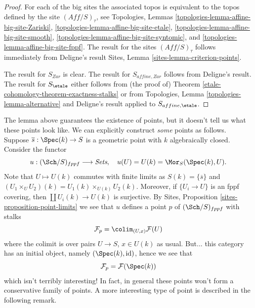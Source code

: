 \begin{proof}
For each of the big sites the associated topos is equivalent to the
topos defined by the site $(\textit{Aff}/S)_\tau$, see
Topologies, Lemmas \ref{topologies-lemma-affine-big-site-Zariski},
\ref{topologies-lemma-affine-big-site-etale},
\ref{topologies-lemma-affine-big-site-smooth},
\ref{topologies-lemma-affine-big-site-syntomic}, and
\ref{topologies-lemma-affine-big-site-fppf}.
The result for the sites $(\textit{Aff}/S)_\tau$ follows immediately
from Deligne's result
Sites, Lemma \ref{sites-lemma-criterion-points}.

\medskip\noindent
The result for $S_{Zar}$ is clear. The result for $S_{affine, Zar}$
follows from Deligne's result. The result for $S_\etale$
either follows from (the proof of)
Theorem \ref{etale-cohomology-theorem-exactness-stalks}
or from Topologies, Lemma \ref{topologies-lemma-alternative}
and Deligne's result applied to $S_{affine, \etale}$.
\end{proof}

The lemma above guarantees the existence of points, but it doesn't
tell us what these points look like. We can explicitly construct
{\it some} points as follows.
Suppose $\overline{s} : \Spec(k) \to S$ is a geometric
point with $k$ algebraically closed. Consider the functor
$$
u : (\Sch/S)_{fppf} \longrightarrow \textit{Sets},
\quad
u(U) = U(k) = \Mor_S(\Spec(k), U).
$$
Note that $U \mapsto U(k)$ commutes with finite limits as
$S(k) = \{\overline{s}\}$ and
$(U_1 \times_U U_2)(k) = U_1(k) \times_{U(k)} U_2(k)$.
Moreover, if $\{U_i \to U\}$ is an fppf covering, then
$\coprod U_i(k) \to U(k)$ is surjective.
By
Sites, Proposition \ref{sites-proposition-point-limits}
we see that $u$ defines a point $p$ of $(\Sch/S)_{fppf}$ with
stalks
$$
\mathcal{F}_p = \colim_{(U, x)} \mathcal{F}(U)
$$
where the colimit is over pairs $U \to S$, $x \in U(k)$ as usual.
But... this category has an initial object, namely
$(\Spec(k), \text{id})$, hence we see that
$$
\mathcal{F}_p = \mathcal{F}(\Spec(k))
$$
which isn't terribly interesting! In fact, in general these points won't
form a conservative family of points. A more interesting type of point
is described in the following remark.

